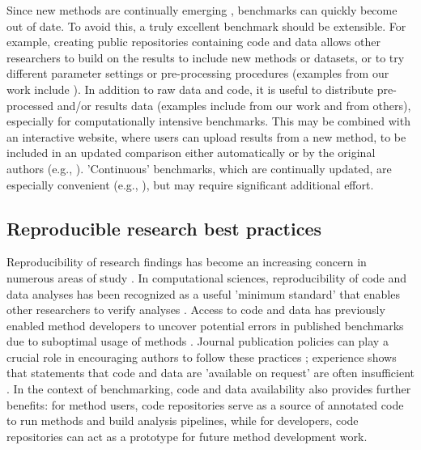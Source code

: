 Since new methods are continually emerging \cite{zappia_exploringsinglecellrnaseq_2018}, benchmarks can quickly become out of date. To avoid this, a truly excellent benchmark should be extensible. For example, creating public repositories containing code and data allows other researchers to build on the results to include new methods or datasets, or to try different parameter settings or pre-processing procedures (examples from our work include \cite{saelens_comparisonsinglecelltrajectory_2019,duo_systematicperformanceevaluation_2018,soneson_biasrobustnessscalability_2018,saelens_comprehensiveevaluationmodule_2018,weber_comparisonclusteringmethods_2016}). In addition to raw data and code, it is useful to distribute pre-processed and/or results data (examples include \cite{duo_systematicperformanceevaluation_2018,soneson_biasrobustnessscalability_2018,soneson_icobraopenreproducible_2016} from our work and \cite{wiwie_comparingperformancebiomedical_2015,bokulich_mockrobiotapublicresource_2016,conchuir_webresourcestandardized_2015} from others), especially for computationally intensive benchmarks. This may be combined with an interactive website, where users can upload results from a new method, to be included in an updated comparison either automatically or by the original authors (e.g., \cite{kanitz_comparativeassessmentmethods_2015,cope_benchmarkaffymetrixgenechip_2004,irizarry_comparisonaffymetrixgenechip_2006}). 'Continuous' benchmarks, which are continually updated, are especially convenient (e.g., \cite{barton_nucleotidesgenomeassembler_2014}), but may require significant additional effort.

\subsection{Reproducible research best practices}

Reproducibility of research findings has become an increasing concern in numerous areas of study \cite{ioannidis_whymostpublished_2005}. In computational sciences, reproducibility of code and data analyses has been recognized as a useful 'minimum standard' that enables other researchers to verify analyses \cite{peng_reproducibleresearchcomputational_2011}. Access to code and data has previously enabled method developers to uncover potential errors in published benchmarks due to suboptimal usage of methods \cite{vaquero-garcia_leafcuttervsmajiq_2018,zhou_countbaseddifferentialexpression_2015,zhou_mirnaseqnormalizationcomparisons_2013}. Journal publication policies can play a crucial role in encouraging authors to follow these practices \cite{hofner_reproducibleresearchstatistics_2016}; experience shows that statements that code and data are 'available on request' are often insufficient \cite{boulesteix_makingcomplexprediction_2019}. In the context of benchmarking, code and data availability also provides further benefits: for method users, code repositories serve as a source of annotated code to run methods and build analysis pipelines, while for developers, code repositories can act as a prototype for future method development work.


